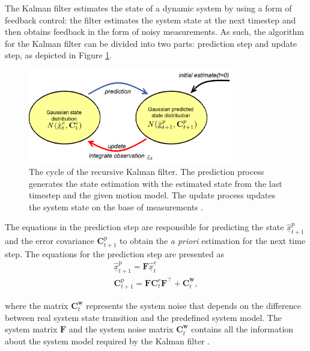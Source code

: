 The Kalman filter estimates the state of a dynamic system by using a form of feedback control: the filter estimates the system state at the next timestep and then obtains feedback in the form of noisy measurements. As such, the algorithm for the Kalman filter can be divided into two parts: prediction step and update step, as depicted in Figure \ref{Structure Kalman filter}. 

\begin{figure}[htbp]
\centering
\includegraphics[width=0.8\textwidth]{figures/Structure Kalman Filter2.png}
\caption{The cycle of the recursive Kalman filter. The prediction process generates the state estimation with the estimated state from the last timestep and the given motion model. The update process updates the system state on the base of measurements  \cite{welch1995introduction}.}
\label{Structure Kalman filter}
\end{figure}

The equations in the prediction step are responsible for predicting the state $\hat{\underline{x}}^{\mathrm{p}}_{t+1}$ and the error covariance $\textbf{C}_{t+1}^{\mathrm{p}}$ to obtain the \textit{a priori} estimation for the next time step. The equations for the prediction step are presented as 
\begin{gather}
    \hat{\underline{x}}^{\mathrm{p}}_{t+1}=\mathbf{F}\hat{\underline{x}}^{\mathrm{e}}_{t}\\
    \mathbf{C}_{t+1}^{\mathrm{p}}=\mathbf{F}\mathbf{C}_{t}^{\mathrm{e}}\mathbf{F}^\top+{ \mathbf{C}_{t}^{\underline{\boldsymbol{w}}}}, 
\end{gather}

where the matrix $\mathbf{C}_{t}^{\underline{\boldsymbol{w}}}$ represents the system noise that depends on the difference between real system state transition and the predefined system model. The system matrix $\mathbf{F}$ and the system noise matrix $\mathbf{C}_{t}^{\underline{\boldsymbol{w}}}$ contains all the information about the system model required by the Kalman filter \cite{pfaff2019multitarget}.

